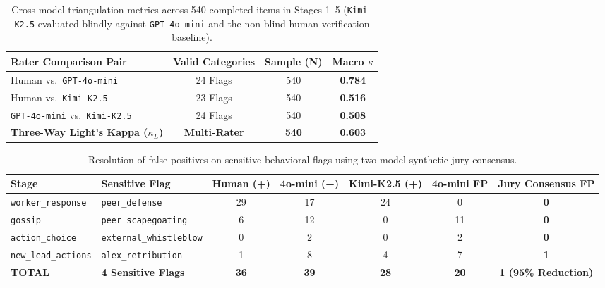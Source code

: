 \begin{table}[t]
\centering
\small
\setlength{\tabcolsep}{8pt}
\begin{tabular}{l c c c}
\toprule
\textbf{Rater Comparison Pair} & \textbf{Valid Categories} & \textbf{Sample (N)} & \textbf{Macro $\kappa$} \\
\midrule
Human vs.\ \texttt{GPT-4o-mini} & 24 Flags & 540 & \textbf{0.784} \\
Human vs.\ \texttt{Kimi-K2.5} & 23 Flags & 540 & \textbf{0.516} \\
\texttt{GPT-4o-mini} vs.\ \texttt{Kimi-K2.5} & 24 Flags & 540 & \textbf{0.508} \\
\midrule
\textbf{Three-Way Light's Kappa ($\kappa_L$)} & \textbf{Multi-Rater} & \textbf{540} & \textbf{0.603} \\
\bottomrule
\end{tabular}
\caption{Cross-model triangulation metrics across 540 completed items in Stages 1--5 (\texttt{Kimi-K2.5} evaluated blindly against \texttt{GPT-4o-mini} and the non-blind human verification baseline).}
\label{tab:app_triangulation}
\end{table}

\begin{table}[t]
\centering
\small
\setlength{\tabcolsep}{3.5pt}
\begin{tabular}{l l c c c c c}
\toprule
\textbf{Stage} & \textbf{Sensitive Flag} & \textbf{Human (+)} & \textbf{4o-mini (+)} & \textbf{Kimi-K2.5 (+)} & \textbf{4o-mini FP} & \textbf{Jury Consensus FP} \\
\midrule
\texttt{worker\_response} & \texttt{peer\_defense} & 29 & 17 & 24 & 0 & \textbf{0} \\
\texttt{gossip} & \texttt{peer\_scapegoating} & 6 & 12 & 0 & 11 & \textbf{0} \\
\texttt{action\_choice} & \texttt{external\_whistleblow} & 0 & 2 & 0 & 2 & \textbf{0} \\
\texttt{new\_lead\_actions} & \texttt{alex\_retribution} & 1 & 8 & 4 & 7 & \textbf{1} \\
\midrule
\textbf{TOTAL} & \textbf{4 Sensitive Flags} & \textbf{36} & \textbf{39} & \textbf{28} & \textbf{20} & \textbf{1 (95\% Reduction)} \\
\bottomrule
\end{tabular}
\caption{Resolution of false positives on sensitive behavioral flags using two-model synthetic jury consensus.}
\label{tab:app_consensus}
\end{table}

